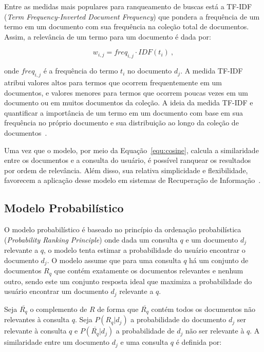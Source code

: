 Entre as medidas mais populares para ranqueamento de buscas está a TF-IDF (\textit{Term Frequency-Inverted Document Frequency}) que pondera a frequência de um termo em um documento com sua frequência na coleção total de documentos. Assim, a relevância de um termo para um documento é dada por:

\begin{equation}
	w_{i,j} = freq_{i,j} \cdot IDF(t_i)~,
\end{equation}


\noindent
onde $freq_{i,j}$ é a frequência do termo $t_i$ no documento $d_j$. A medida TF-IDF atribui valores altos para termos que ocorrem frequentemente em um documentos, e valores menores para termos que ocorrem poucas vezes em um documento ou em muitos documentos da coleção. A ideia da medida TF-IDF e quantificar a importância de um termo em um documento com base em sua frequência no próprio documento e sua distribuição ao longo da coleção de documentos~\cite{Croft2009,Salton1988,Shamsinejadbabki2012,Salton:1994}.


Uma vez que o modelo, por meio da Equação~\ref{equ:cosine}, calcula a similaridade entre os documentos e a consulta do usuário, é possível ranquear os resultados por ordem de relevância. Além disso, sua relativa simplicidade e flexibilidade, favorecem a aplicação desse modelo em sistemas de Recuperação de Informação~\cite{Tan2005,Croft2009,Manning2008}.



\subsection{Modelo Probabilístico}

 
O modelo probabilístico é baseado no princípio da ordenação probabilística (\textit{Probability Ranking Principle}) onde dada um consulta $q$ e um documento $d_j$ relevante a $q$, o modelo tenta estimar a probabilidade do usuário encontrar o documento $d_j$. O modelo assume que para uma consulta $q$ há um conjunto de documentos $R_q$ que contém exatamente os documentos relevantes e nenhum outro, sendo este um conjunto resposta ideal que maximiza a probabilidade do usuário encontrar um documento $d_j$ relevante a $q$. 

Seja $\overline{R_q}$ o complemento de $R$ de forma que $\overline{R_q}$ contém todos os documentos não relevantes à consulta $q$. Seja $P(R_q|d_j)$ a probabilidade do documento $d_j$ ser relevante à consulta $q$ e $P(\overline{R_q}|d_j)$ a probabilidade de $d_j$ não ser relevante à $q$. A similaridade entre um documento $d_j$ e uma consulta $q$ é definida por:





